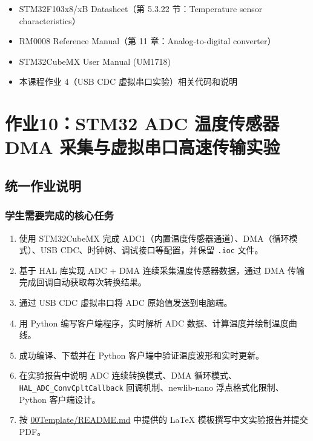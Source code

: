 \documentclass[
  chinese,
  UTF8,
  oneside,
  openany]{ctexbook}
\providecommand{\tightlist}{%
  \setlength{\itemsep}{0pt}\setlength{\parskip}{0pt}}
\begin{document}
\begin{itemize}
\tightlist
\item
  STM32F103x8/xB Datasheet（第 5.3.22 节：Temperature sensor
  characteristics）
\item
  RM0008 Reference Manual（第 11 章：Analog-to-digital converter）
\item
  STM32CubeMX User Manual (UM1718)
\item
  本课程作业 4（USB CDC 虚拟串口实验）相关代码和说明
\end{itemize}

\chapter{作业10：STM32 ADC 温度传感器 DMA
采集与虚拟串口高速传输实验}\label{ux4f5cux4e1a10stm32-adc-ux6e29ux5ea6ux4f20ux611fux5668-dma-ux91c7ux96c6ux4e0eux865aux62dfux4e32ux53e3ux9ad8ux901fux4f20ux8f93ux5b9eux9a8c}

\section{统一作业说明}\label{ux7edfux4e00ux4f5cux4e1aux8bf4ux660e-5}

\subsection{学生需要完成的核心任务}\label{ux5b66ux751fux9700ux8981ux5b8cux6210ux7684ux6838ux5fc3ux4efbux52a1-5}

\begin{enumerate}
\def\labelenumi{\arabic{enumi}.}
\tightlist
\item
  使用 STM32CubeMX 完成 ADC1（内置温度传感器通道）、DMA（循环模式）、USB
  CDC、时钟树、调试接口等配置，并保留 \texttt{.ioc} 文件。
\item
  基于 HAL 库实现 ADC + DMA 连续采集温度传感器数据，通过 DMA
  传输完成回调自动获取每次转换结果。
\item
  通过 USB CDC 虚拟串口将 ADC 原始值发送到电脑端。
\item
  用 Python 编写客户端程序，实时解析 ADC 数据、计算温度并绘制温度曲线。
\item
  成功编译、下载并在 Python 客户端中验证温度波形和实时更新。
\item
  在实验报告中说明 ADC 连续转换模式、DMA
  循环模式、\texttt{HAL\_ADC\_ConvCpltCallback} 回调机制、newlib-nano
  浮点格式化限制、Python 客户端设计。
\item
  按 \href{../00Template/README.md}{00Template/README.md} 中提供的 LaTeX
  模板撰写中文实验报告并提交 PDF。
\end{enumerate}
\end{document}
